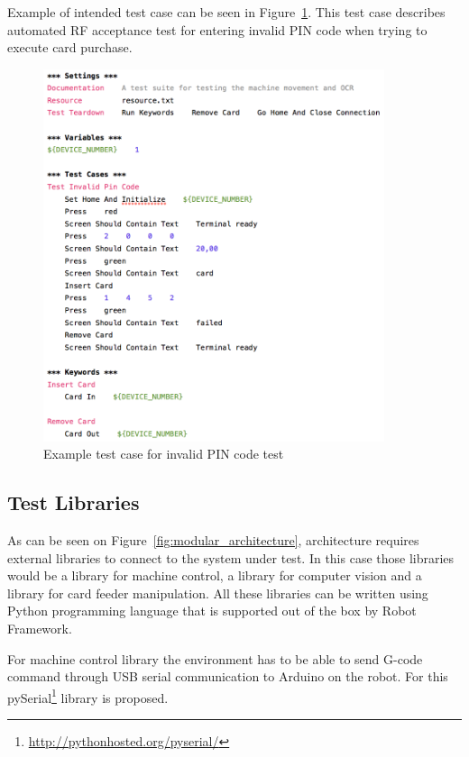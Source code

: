 Example of intended test case can be seen in Figure~\ref{fig:invalid_pin_test}. This test case describes automated RF acceptance test for entering invalid PIN code when trying to execute card purchase.

\begin{figure}[ht]
  \begin{center}
    \includegraphics[width=10cm]{images/example_test.png}
    \caption{Example test case for invalid PIN code test}
    \label{fig:invalid_pin_test}
  \end{center}
\end{figure}

\FloatBarrier
\subsection{Test Libraries}
\label{subsection:test libraries}

As can be seen on Figure~\ref{fig:modular_architecture}, architecture requires external libraries to connect to the system under test. In this case those libraries would be a library for machine control, a library for computer vision and a library for card feeder manipulation. All these libraries can be written using Python programming language that is supported out of the box by Robot Framework.

For machine control library the environment has to be able to send G-code command through USB serial communication to Arduino on the robot. For this pySerial\footnote{\url{http://pythonhosted.org/pyserial/}} library is proposed.


